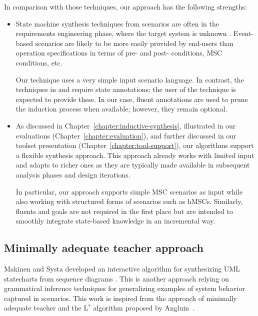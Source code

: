 In comparison with those techniques, our approach has the following strengths:
\begin{itemize}
\item State machine synthesis techniques from scenarios are often in the requirements engineering phase, where the target system is unknown \cite{Weidenhaupt:1998}. Event-based scenarios are likely to be more easily provided by end-users than operation specifications in terms of pre- and post- conditions, MSC conditions, etc. 

Our technique uses a very simple input scenario language. In contrast, the techniques in \cite{Kruger:2000} and \cite{Whittle:2000} require state annotations; the user of the technique is expected to provide these. In our case, fluent annotations are used to prune the induction process when available; however, they remain optional.

\item As discussed in Chapter~\ref{chapter:inductive-synthesis}, illustrated in our evaluations (Chapter~\ref{chapter:evaluation}), and further discussed in our toolset presentation (Chapter~\ref{chapter:tool-support}), our algorithms support a flexible synthesis approach. This approach already works with limited input and adapts to richer ones as they are typically made available in subsequent analysis phases and design iterations. 

In particular, our approach supports simple MSC scenarios as input while also working with structured forms of scenarios such as hMSCs. Similarly, fluents and goals are not required in the first place but are intended to smoothly integrate state-based knowledge in an incremental way.
\end{itemize}


\subsection{Minimally adequate teacher approach}

Makinen and Systa developed an interactive algorithm for synthesizing UML statecharts from sequence diagrams \cite{Makinen:2001}. This is another approach relying on grammatical inference techniques for generalizing examples of system behavior captured in scenarios. This work is inspired from the approach of minimally adequate teacher and the L$^*$ algorithm proposed by Angluin~\cite{Angluin:1987}. 

